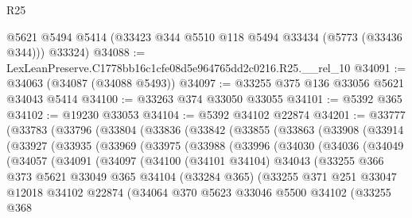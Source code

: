 \begin{lexlean}{R25}
\begin{coremodule}
      @5621
      @5494
      @5414
      (@33423 @344 @5510 @118 @5494 @33434 (@5773 (@33436 @344)))
      @33324)
@34088 := LexLeanPreserve.C1778bb16c1cfe08d5e964765dd2c0216.R25.__rel_10
@34091 := @34063 (@34087 (@34088 @5493))
@34097 := @33255 @375 @136 @33056 @5621 @34043 @5414
@34100 := @33263 @374 @33050 @33055
@34101 := @5392 @365
@34102 := @19230 @33053
@34104 := @5392 @34102 @22874
@34201 := @33777
    (@33783
      (@33796
        (@33804
          (@33836
            (@33842
              (@33855
                (@33863
                  (@33908
                    (@33914
                      (@33927
                        (@33935
                          (@33969
                            (@33975
                              (@33988
                                (@33996
                                  (@34030
                                    (@34036
                                      (@34049
                                        (@34057
                                          (@34091
                                            (@34097
                                              (@34100
                                                (@34101 @34104)
                                                @34043
                                                (@33255
                                                  @366
                                                  @373
                                                  @5621
                                                  @33049
                                                  @365
                                                  @34104
                                                  (@33284 @365)
                                                  (@33255
                                                    @371
                                                    @251
                                                    @33047
                                                    @12018
                                                    @34102
                                                    @22874
                                                    (@34064
                                                      @370
                                                      @5623
                                                      @33046
                                                      @5500
                                                      @34102
                                                      (@33255
                                                        @368

\end{coremodule}
\end{lexlean}
